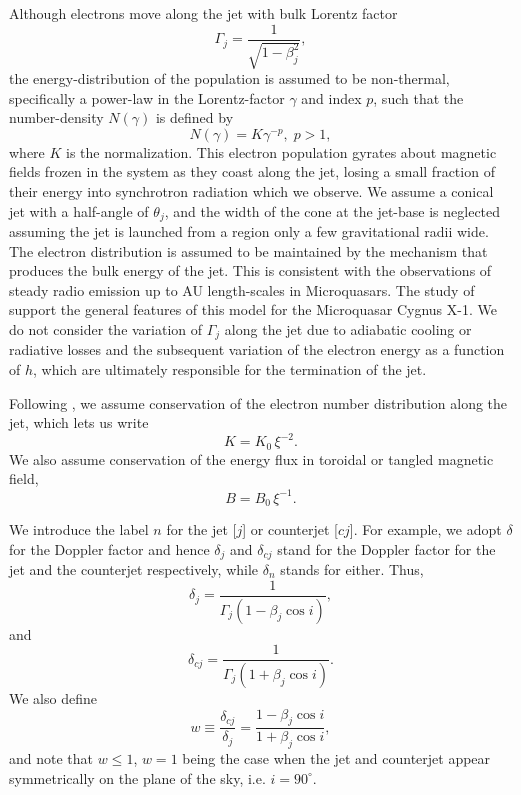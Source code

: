 Although electrons move along the jet with bulk Lorentz factor
\begin{equation}
\Gamma_j = \dfrac{1}{\sqrt{1-\beta_j^{2}}},
\end{equation} the energy-distribution of the population is assumed to be non-thermal, specifically a power-law in the Lorentz-factor $ \gamma $ and index $p$, such that the number-density $N(\gamma)$ is defined by 
\begin{equation}
N(\gamma) = K \gamma^{-p}, \; p > 1,
\label{eq:energy-distribution}
\end{equation}
where $K$ is the normalization. This electron population gyrates about magnetic fields frozen in the system as they coast along the jet, losing a small fraction of their energy into synchrotron radiation which we observe. We assume a conical jet with a half-angle of $ \theta_j $, and the width of the cone at the jet-base is neglected assuming the jet is launched from a region only a few gravitational radii wide. The electron distribution is assumed to be maintained by the mechanism that produces the bulk energy of the jet. This is consistent with the observations of steady radio emission up to AU length-scales in Microquasars. The study of \cite{Russell_&_Shahbaz-2014-MNRAS} support the general features of this model for the Microquasar Cygnus X-1. We do not consider the variation of $ \Gamma_j $ along the jet due to adiabatic cooling or radiative losses and the subsequent variation of the electron energy as a function of $h$, which are ultimately responsible for the termination of the jet.

Following , we assume conservation of the electron number distribution along the jet, which lets us write
\begin{equation}
K = K_0 \, \xi^{-2}.
\label{eq:K}
\end{equation}
We also assume conservation of the energy flux in toroidal or tangled magnetic field,
\begin{equation}
B = B_0 \, \xi^{-1}.
\label{eq:B}
\end{equation}

We introduce the label $n$ for the jet [$j$] or counterjet [$cj$]. For example, we adopt $\delta$ for the Doppler factor and hence $ \delta_j$ and $\delta_{cj}$ stand for the Doppler factor for the jet and the counterjet respectively, while $\delta_n$ stands for either. Thus,
\begin{equation}
\delta_j = \dfrac{1}{ \Gamma_j \left( 1 - \beta_j \cos i \right) },
\label{eq:Doppler_factor_for_jet}
\end{equation} and
\begin{equation}
\delta_{cj} = \dfrac{1}{ \Gamma_j \left( 1 + \beta_j \cos i \right) }.
\label{eq:Doppler_factor_for_counterjet}
\end{equation}
We also define
\begin{equation}
w \equiv \frac{\delta_{cj}}{\delta_{j}} = \dfrac{1 - \beta_j \cos i}{1 + \beta_j \cos i},
\label{eq:w}
\end{equation} and note that $w \leq 1$, $w = 1$ being the case when the jet and counterjet appear symmetrically on the plane of the sky, i.e. $i = 90^{\circ}$.

